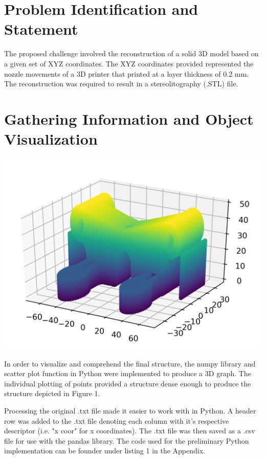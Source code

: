 \documentclass[11pt, A4paper]{article}
\begin{document}
\setlength\columnsep{15pt}
\begin{multicols}{2}


\section{Problem Identification and Statement}

The proposed challenge involved the reconstruction of a solid 3D model based on a given set of XYZ coordinates. The XYZ coordinates provided represented the nozzle movements of a 3D printer that printed at a layer thickness of 0.2 mm. The reconstruction was required to result in a stereolitography (.STL) file.



\section{Gathering Information and Object Visualization}

\begingroup
    \bigskip
    \centering
    \includegraphics[width=\columnwidth]{scatter}
    \small{}
    \label{fig:python_vis}
        \bigskip
\endgroup

In order to visualize and comprehend the final structure, the numpy library and scatter plot function in Python were implemented to produce a 3D graph. The individual plotting of points provided a structure dense enough to produce the structure depicted in Figure 1.

Processing the original .txt file made it easier to work with in Python. A header row was added to the .txt file denoting each column with it's respective descriptor (i.e. "x  coor" for x coordinates). The .txt file was then saved as a .csv file for use with the pandas library. The code used for the preliminary Python implementation can be founder under listing 1 in the Appendix.


\end{multicols}
\end{document}
